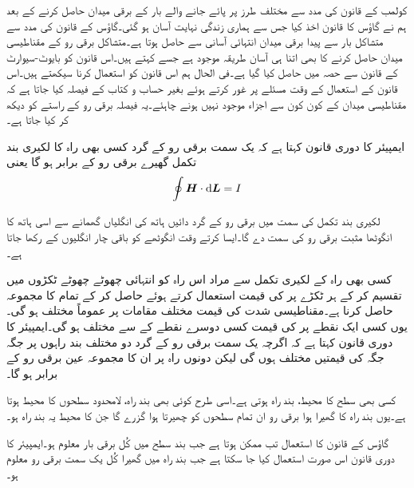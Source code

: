 کولمب کے قانون کی مدد سے مختلف طرز پر پائے جانے والے بار کے برقی میدان حاصل کرنے کے بعد ہم نے گاؤس کا قانون اخذ کیا جس سے ہماری زندگی نہایت آسان ہو گئی۔گاؤس کے قانون کی مدد سے متشاکل بار سے پیدا برقی میدان انتہائی آسانی سے حاصل ہوتا ہے۔متشاکل برقی رو کے مقناطیسی میدان حاصل کرنے کا بھی اتنا ہی آسان طریقہ موجود ہے جسے  کہتے ہیں۔اس قانون کو بایوٹ-سیوارٹ کے قانون سے حصہ  میں حاصل کیا گیا ہے۔فی الحال ہم اس قانون کو استعمال کرنا سیکھتے ہیں۔اس قانون کے استعمال کے وقت مسئلے پر غور کرتے ہوئے بغیر حساب و کتاب کے فیصلہ کیا جاتا ہے کہ مقناطیسی میدان کے کون کون سے اجزاء موجود نہیں ہونے چاہئے۔یہ فیصلہ برقی رو کے راستے کو دیکھ کر کیا جاتا ہے۔

ایمپیئر کا دوری قانون کہتا ہے کہ یک سمت برقی رو کے گرد کسی بھی راہ  کا لکیری بند تکمل گھیرے برقی رو کے برابر ہو گا یعنی
\begin{align}\label{مساوات_مقناطیسی_ایمپیئر_کا_دوری_قانون}
\oint \kvec{H} \cdot \dif \kvec{L}=I
\end{align}

لکیری بند تکمل کی سمت میں برقی رو کے گرد  دائیں ہاتھ کی انگلیاں گھمانے سے اسی ہاتھ کا انگوٹھا مثبت برقی رو کی سمت دے گا۔ایسا کرتے وقت انگوٹھے کو باقی چار انگلیوں کے   رکھا جاتا ہے۔

کسی بھی راہ  کے لکیری تکمل سے مراد اس راہ  کو انتہائی چھوٹے چھوٹے ٹکڑوں  میں تقسیم کر کے ہر ٹکڑے پر  کی قیمت استعمال کرتے ہوئے  حاصل کر کے تمام  کا مجموعہ حاصل کرنا ہے۔مقناطیسی شدت  کی قیمت مختلف مقامات پر عموماً مختلف ہو گی۔یوں کسی ایک نقطے پر  کی قیمت کسی دوسرے نقطے کے  سے مختلف ہو گی۔ایمپیئر کا دوری قانون کہتا ہے کہ اگرچہ یک سمت برقی رو کے گرد دو مختلف بند راہوں پر جگہ جگہ  کی قیمتیں مختلف ہوں گی لیکن دونوں راہ پر ان کا مجموعہ عین برقی رو کے برابر ہو گا۔

کسی بھی سطح کا محیط، بند راہ ہوتی ہے۔اسی طرح کوئی بھی بند راہ، لامحدود سطحوں کا محیط ہوتا ہے۔یوں بند راہ کا گھیرا ہوا برقی رو ان تمام سطحوں کو چھیرتا ہوا گزرے گا جن کا محیط یہ بند راہ ہو۔

گاؤس کے قانون کا استعمال تب ممکن ہوتا ہے جب بند سطح میں کُل برقی بار معلوم ہو۔ایمپیئر کا دوری قانون اس صورت استعمال کیا جا سکتا ہے جب  بند راہ میں گھیرا کُل یک سمت برقی رو معلوم ہو۔   

